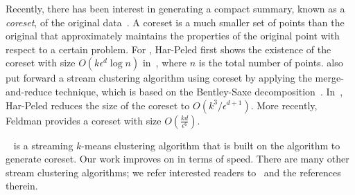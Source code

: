 Recently, there has been interest in generating a compact summary, known as a
\emph{coreset}, of the original data~\cite{AHV04}.  A coreset is a much smaller
set of points than the original that approximately maintains the properties of
the original point with respect to a certain problem. For \km, Har-Peled first
shows the existence of the coreset with size $O(k\epsilon^d \log n)$
in~\cite{HM04}, where $n$ is the total number of points. \cite{HM04} also put
forward a stream clustering algorithm using coreset by applying the
merge-and-reduce technique, which is based on the Bentley-Saxe
decomposition~\cite{BS80}. In~\cite{HK07}, Har-Peled reduces the size of the
coreset to $O(k^3/\epsilon^{d+1})$. More recently, Feldman\cite{FL11} provides a
coreset with size $O(\frac{kd}{\epsilon^6})$.

\skmpp~\cite{AMR+12} is a streaming $k$-means clustering algorithm that is built
on the \kmpp algorithm to generate coreset. Our work improves on \skmpp in terms
of speed. There are many other stream clustering algorithms; we refer interested
readers to~\cite{AMR+12} and the references therein.


